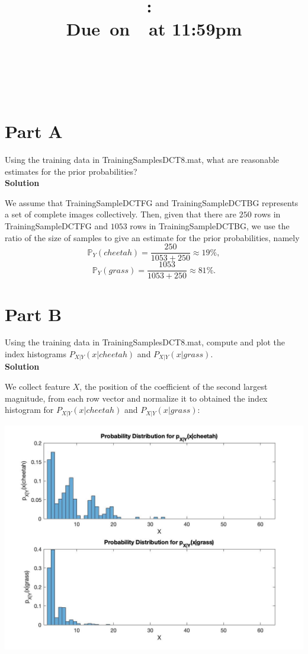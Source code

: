 \documentclass{article}
\title{
    \vspace{2in}
    \textmd{\textbf{\hmwkClass:\ \hmwkTitle}}\\
    \normalsize\vspace{0.1in}\small{Due\ on\ \hmwkDueDate\ at 11:59pm}\\
    \vspace{0.1in}\large{\textit{\hmwkClassInstructor}} \\
    \vspace{3in}
}
\author{
  \hmwkAuthorName \\
  \vspace{0.1in}\small\hmwkPID
}
\date{}
\newcommand*{\prob}{\mathds{P}}
\begin{document}
\maketitle

\pagebreak

\section*{Part A}
Using the training data in {\selectfont TrainingSamplesDCT\textunderscore8.mat}, what are reasonable estimates for the prior probabilities? \\

\textbf{\large Solution}

We assume that {\selectfont TrainingSampleDCT\textunderscore FG} and 
{\selectfont TrainingSampleDCT\textunderscore BG} represents a set of complete images collectively.
Then, given that there are $250$ rows in {\selectfont TrainingSampleDCT\textunderscore FG}
and $1053$ rows in {\selectfont TrainingSampleDCT\textunderscore BG},
we use the ratio of the size of samples to give an estimate for the prior probabilities, namely 
\[
  \prob_Y(cheetah) = \frac{250}{1053 + 250} \approx 19\%,
\]
\[
  \prob_Y(grass) = \frac{1053}{1053 + 250} \approx 81\%.
\]

\section*{Part B}
Using the training data in {\selectfont TrainingSamplesDCT\textunderscore8.mat}, compute and plot the index histograms
$P_{X|Y}(x|cheetah)$ and $P_{X|Y}(x|grass)$. \\

\textbf{\large Solution}

We collect feature $X$, the position of the coefficient of the second largest magnitude, from each row vector and normalize it to 
obtained the index histogram for $P_{X|Y}(x|cheetah)$ and $P_{X|Y}(x|grass)$:
\begin{center}
  \includegraphics[scale=0.3]{probability_histogram}
\end{center}
\end{document}
